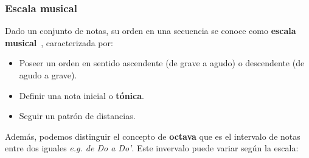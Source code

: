 \subsubsection{Escala musical}
Dado un conjunto de notas, su orden en una secuencia se conoce como \textbf{\gls{escala musical}}~\cite{wikipedia_escala_musical}, caracterizada por:

\begin{itemize}
    \item Poseer un orden en sentido ascendente (de grave a agudo) o descendente (de agudo a grave).
    \item Definir una nota inicial o \textbf{\gls{tónica}}.
    \item Seguir un patrón de distancias.
\end{itemize}

Además, podemos distinguir el concepto de \textbf{\gls{octava}} que es el intervalo de notas entre dos iguales \emph{e.g. de Do a Do'}. Este invervalo puede variar según la escala:

